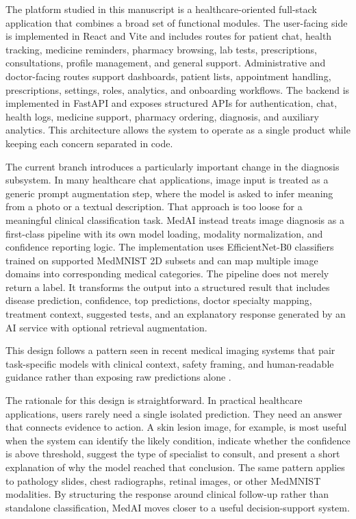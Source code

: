 \documentclass[conference]{IEEEtran}
\begin{document}
The platform studied in this manuscript is a healthcare-oriented full-stack application that combines a broad set of functional modules. The user-facing side is implemented in React and Vite and includes routes for patient chat, health tracking, medicine reminders, pharmacy browsing, lab tests, prescriptions, consultations, profile management, and general support. Administrative and doctor-facing routes support dashboards, patient lists, appointment handling, prescriptions, settings, roles, analytics, and onboarding workflows. The backend is implemented in FastAPI and exposes structured APIs for authentication, chat, health logs, medicine support, pharmacy ordering, diagnosis, and auxiliary analytics. This architecture allows the system to operate as a single product while keeping each concern separated in code.

The current branch introduces a particularly important change in the diagnosis subsystem. In many healthcare chat applications, image input is treated as a generic prompt augmentation step, where the model is asked to infer meaning from a photo or a textual description. That approach is too loose for a meaningful clinical classification task. MedAI instead treats image diagnosis as a first-class pipeline with its own model loading, modality normalization, and confidence reporting logic. The implementation uses EfficientNet-B0 classifiers trained on supported MedMNIST 2D subsets and can map multiple image domains into corresponding medical categories. The pipeline does not merely return a label. It transforms the output into a structured result that includes disease prediction, confidence, top predictions, doctor specialty mapping, treatment context, suggested tests, and an explanatory response generated by an AI service with optional retrieval augmentation.

This design follows a pattern seen in recent medical imaging systems that pair task-specific models with clinical context, safety framing, and human-readable guidance rather than exposing raw predictions alone \cite{esteva,chexnet,topol,medmnistv2}.

The rationale for this design is straightforward. In practical healthcare applications, users rarely need a single isolated prediction. They need an answer that connects evidence to action. A skin lesion image, for example, is most useful when the system can identify the likely condition, indicate whether the confidence is above threshold, suggest the type of specialist to consult, and present a short explanation of why the model reached that conclusion. The same pattern applies to pathology slides, chest radiographs, retinal images, or other MedMNIST modalities. By structuring the response around clinical follow-up rather than standalone classification, MedAI moves closer to a useful decision-support system.
\end{document}
